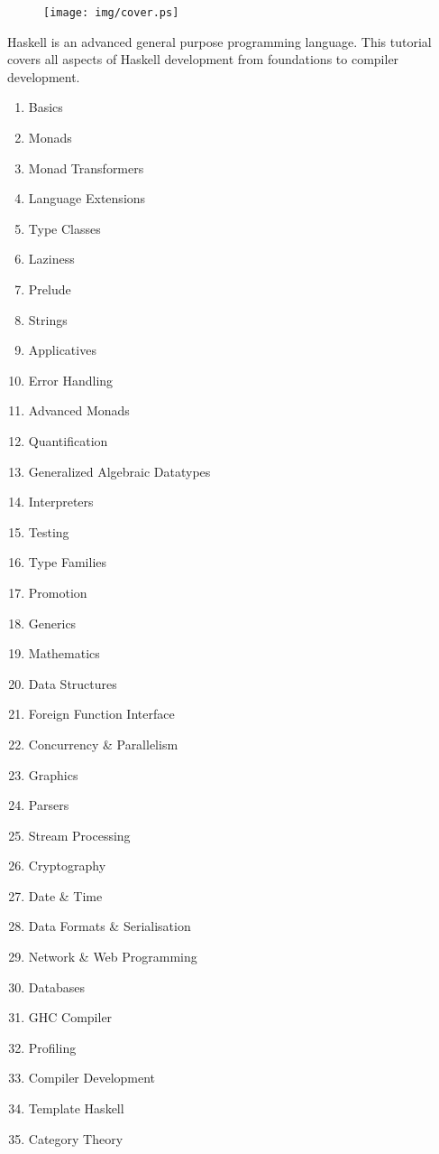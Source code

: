 \pagestyle{empty}

\begin{figure}
    \centering
    \texttt{[image: img/cover.ps]}
\end{figure}

\Large
Haskell is an advanced general purpose programming language. This tutorial
covers all aspects of Haskell development from foundations to compiler
development.

\small
\begin{enumerate}
\item Basics
\item Monads
\item Monad Transformers
\item Language Extensions
\item Type Classes
\item Laziness
\item Prelude
\item Strings
\item Applicatives
\item Error Handling
\item Advanced Monads
\item Quantification
\item Generalized Algebraic Datatypes
\item Interpreters
\item Testing
\item Type Families
\item Promotion
\item Generics
\item Mathematics
\item Data Structures
\item Foreign Function Interface
\item Concurrency \& Parallelism
\item Graphics
\item Parsers
\item Stream Processing
\item Cryptography
\item Date \& Time
\item Data Formats \& Serialisation
\item Network \& Web Programming
\item Databases
\item GHC Compiler
\item Profiling
\item Compiler Development
\item Template Haskell
\item Category Theory
\end{enumerate}
